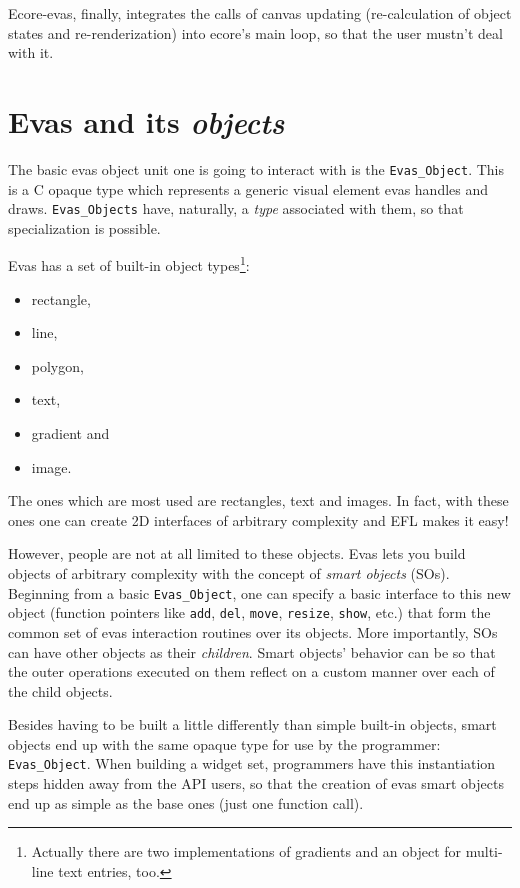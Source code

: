 \documentclass[a4paper]{profusion}
\begin{document}
Ecore-evas, finally, integrates the calls of canvas updating
(re-calculation of object states and re-renderization) into ecore's
main loop, so that the user mustn't deal with it.

\section{Evas and its \emph{objects}}

The basic evas object unit one is going to interact with is the
\texttt{Evas\_Object}. This is a C opaque type which represents a
generic visual element evas handles and draws. \texttt{Evas\_Objects}
have, naturally, a \emph{type} associated with them, so that
specialization is possible.

Evas has a set of built-in object types\footnote{Actually there are
 two implementations of gradients and an object for multi-line text
 entries, too.}:
\begin{itemize}
\item rectangle,
\item line,
\item polygon,
\item text,
\item gradient and
\item image.
\end{itemize}

The ones which are most used are rectangles, text and images. In fact,
with these ones one can create 2D interfaces of arbitrary complexity
and EFL makes it easy!


However, people are not at all limited to these objects. Evas lets you
build objects of arbitrary complexity with the concept of \emph{smart
  objects} (SOs).  Beginning from a basic \texttt{Evas\_Object}, one
can specify a basic interface to this new object (function pointers
like \texttt{add}, \texttt{del}, \texttt{move}, \texttt{resize},
\texttt{show}, etc.) that form the common set of evas interaction
routines over its objects.  More importantly, SOs can have other
objects as their \emph{children}. Smart objects' behavior can be so
that the outer operations executed on them reflect on a custom manner
over each of the child objects.

Besides having to be built a little differently than simple built-in
objects, smart objects end up with the same opaque type for use by the
programmer: \texttt{Evas\_Object}. When building a widget set,
programmers have this instantiation steps hidden away from the API
users, so that the creation of evas smart objects end up as simple as
the base ones (just one function call).
\end{document}
